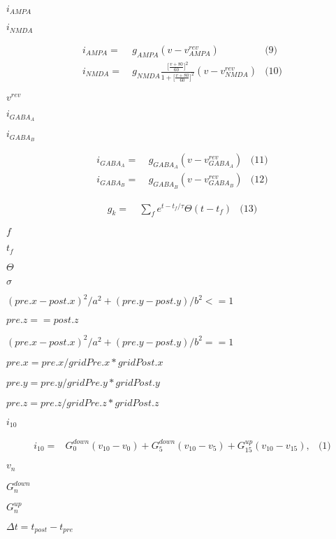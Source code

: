 \documentclass{article}
\begin{document}
$i_{AMPA}$
\pagebreak

$i_{NMDA}$
\pagebreak

\begin{align*} i_{AMPA} = & ~ g_{AMPA}(v-v^{rev}_{AMPA}) & \text{(9)} \\ i_{NMDA} = & ~ g_{NMDA}\frac{\Big[\frac{v+80}{60} \Big]^{2}}{1+\Big[\frac{v+80}{60} \Big]^{2}} (v-v^{rev}_{NMDA}) & \text{(10)} \end{align*}
\pagebreak

$v^{rev}$
\pagebreak

$i_{GABA_A}$
\pagebreak

$i_{GABA_B}$
\pagebreak

\begin{align*} i_{GABA_{A}} = & ~ g_{GABA_{A}}(v-v^{rev}_{GABA_{A}}) & \text{(11)} \\ i_{GABA_{B}} = & ~ g_{GABA_{B}}(v-v^{rev}_{GABA_{B}}) & \text{(12)} \end{align*}
\pagebreak

\begin{align*} g_{k} = & ~ \sum \limits_{f} e^{t-t_{f}/ \tau} \Theta(t-t_f) & \text{(13)} \end{align*}
\pagebreak

$f$
\pagebreak

$t_f$
\pagebreak

$ \Theta $
\pagebreak

$\sigma$
\pagebreak

$ (pre.x-post.x)^2/a^2 + (pre.y-post.y)/b^2 <= 1 $
\pagebreak

$pre.z==post.z$
\pagebreak

$ (pre.x-post.x)^2/a^2 + (pre.y-post.y)/b^2 == 1$
\pagebreak

$ pre.x = pre.x / gridPre.x * gridPost.x $
\pagebreak

$ pre.y = pre.y / gridPre.y * gridPost.y $
\pagebreak

$ pre.z = pre.z / gridPre.z * gridPost.z $
\pagebreak

$i_{10}$
\pagebreak

\begin{align*} i_{10} = & G_0^{down} (v_{10} - v_{0}) + G_5^{down} (v_{10} - v_{5}) + G_{15}^{up} (v_{10} - v_{15}), & \text{(1)} \end{align*}
\pagebreak

$v_n$
\pagebreak

$G_n^{down}$
\pagebreak

$G_n^{up}$
\pagebreak

$ \Delta t = t_{post} - t_{pre} $
\pagebreak
\end{document}

